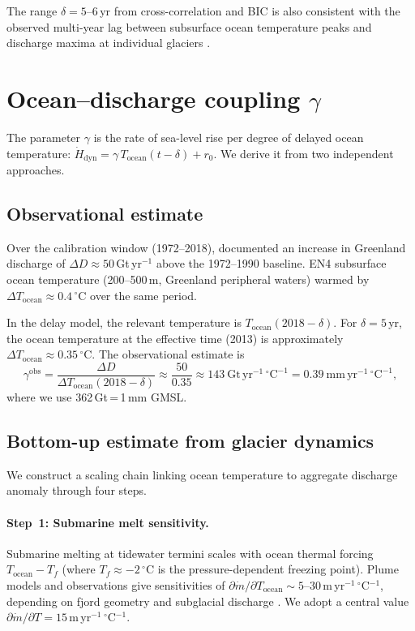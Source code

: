 \documentclass[11pt]{article}
\begin{document}
The range $\delta = 5$--$6$\,yr from cross-correlation and BIC is also consistent with the observed multi-year lag between subsurface ocean temperature peaks and discharge maxima at individual glaciers \citep{Straneo2013, Holland2008}.

\section{Ocean--discharge coupling $\gamma$}
\label{sec:gamma}

The parameter $\gamma$ is the rate of sea-level rise per degree of delayed ocean temperature: $\dot{H}_{\mathrm{dyn}} = \gamma\, T_{\mathrm{ocean}}(t - \delta) + r_0$. We derive it from two independent approaches.

\subsection{Observational estimate}
\label{sec:gamma_obs}

Over the calibration window (1972--2018), \citet{Mouginot2019} documented an increase in Greenland discharge of $\Delta D \approx 50$\,Gt\,yr$^{-1}$ above the 1972--1990 baseline. EN4 subsurface ocean temperature (200--500\,m, Greenland peripheral waters) warmed by $\Delta T_{\mathrm{ocean}} \approx 0.4\,^\circ$C over the same period.

In the delay model, the relevant temperature is $T_{\mathrm{ocean}}(2018 - \delta)$. For $\delta = 5$\,yr, the ocean temperature at the effective time (2013) is approximately $\Delta T_{\mathrm{ocean}} \approx 0.35\,^\circ$C. The observational estimate is
\begin{equation}
	\gamma^{\mathrm{obs}} = \frac{\Delta D}{\Delta T_{\mathrm{ocean}}(2018 - \delta)} \approx \frac{50}{0.35} \approx 143\ \mathrm{Gt\,yr^{-1}\,{^\circ C}^{-1}} = 0.39\ \mathrm{mm\,yr^{-1}\,{^\circ C}^{-1}},
\end{equation}
where we use 362\,Gt\,=\,1\,mm GMSL.

\subsection{Bottom-up estimate from glacier dynamics}
\label{sec:gamma_bottomup}

We construct a scaling chain linking ocean temperature to aggregate discharge anomaly through four steps.

\paragraph{Step~1: Submarine melt sensitivity.}
Submarine melting at tidewater termini scales with ocean thermal forcing $T_{\mathrm{ocean}} - T_f$ (where $T_f \approx -2\,^\circ$C is the pressure-dependent freezing point). Plume models and observations give sensitivities of $\partial \dot{m} / \partial T_{\mathrm{ocean}} \sim 5$--$30$\,m\,yr$^{-1}$\,$^\circ$C$^{-1}$, depending on fjord geometry and subglacial discharge \citep{Xu2013, Rignot2016, Jackson2022}. We adopt a central value $\partial \dot{m}/\partial T = 15$\,m\,yr$^{-1}$\,$^\circ$C$^{-1}$.
\end{document}
